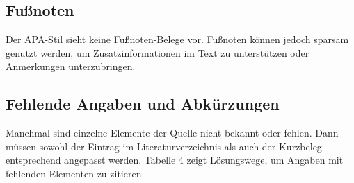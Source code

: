 \documentclass[
  letterpaper,
  DIV=11]{scrreprt}
\begin{document}
\subsection{Fußnoten}\label{fuuxdfnoten}

Der APA-Stil sieht keine Fußnoten-Belege vor. Fußnoten können jedoch
sparsam genutzt werden, um Zusatzinformationen im Text zu unterstützen
oder Anmerkungen unterzubringen.

\subsection{Fehlende Angaben und
Abkürzungen}\label{fehlende-angaben-und-abkuxfcrzungen}

Manchmal sind einzelne Elemente der Quelle nicht bekannt oder fehlen.
Dann müssen sowohl der Eintrag im Literaturverzeichnis als auch der
Kurzbeleg entsprechend angepasst werden. Tabelle 4 zeigt Lösungswege, um
Angaben mit fehlenden Elementen zu zitieren.
\end{document}
